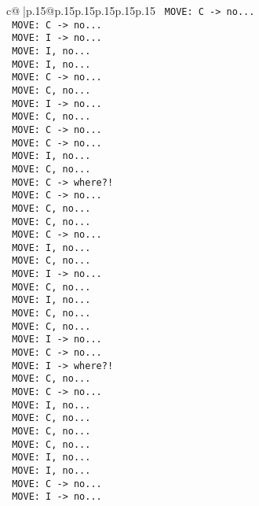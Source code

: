 \documentclass{article}
\begin{document}
{\begin{supertabular}{c@{$\;$}|p{.15\linewidth}@{}p{.15\linewidth}p{.15\linewidth}p{.15\linewidth}p{.15\linewidth}p{.15\linewidth}}
{{{\texttt{ MOVE: C {-}> no...} \\
\texttt{ MOVE: C {-}> no...} \\
\texttt{ MOVE: I {-}> no...} \\
\texttt{ MOVE: I, no...} \\
\texttt{ MOVE: I, no...} \\
\texttt{ MOVE: C {-}> no...} \\
\texttt{ MOVE: C, no...} \\
\texttt{ MOVE: I {-}> no...} \\
\texttt{ MOVE: C, no...} \\
\texttt{ MOVE: C {-}> no...} \\
\texttt{ MOVE: C {-}> no...} \\
\texttt{ MOVE: I, no...} \\
\texttt{ MOVE: C, no...} \\
\texttt{ MOVE: C {-}> where?!} \\
\texttt{ MOVE: C {-}> no...} \\
\texttt{ MOVE: C, no...} \\
\texttt{ MOVE: C, no...} \\
\texttt{ MOVE: C {-}> no...} \\
\texttt{ MOVE: I, no...} \\
\texttt{ MOVE: C, no...} \\
\texttt{ MOVE: I {-}> no...} \\
\texttt{ MOVE: C, no...} \\
\texttt{ MOVE: I, no...} \\
\texttt{ MOVE: C, no...} \\
\texttt{ MOVE: C, no...} \\
\texttt{ MOVE: I {-}> no...} \\
\texttt{ MOVE: C {-}> no...} \\
\texttt{ MOVE: I {-}> where?!} \\
\texttt{ MOVE: C, no...} \\
\texttt{ MOVE: C {-}> no...} \\
\texttt{ MOVE: I, no...} \\
\texttt{ MOVE: C, no...} \\
\texttt{ MOVE: C, no...} \\
\texttt{ MOVE: C, no...} \\
\texttt{ MOVE: I, no...} \\
\texttt{ MOVE: I, no...} \\
\texttt{ MOVE: C {-}> no...} \\
\texttt{ MOVE: I {-}> no...} \\
}}}
\end{supertabular}}
\end{document}
